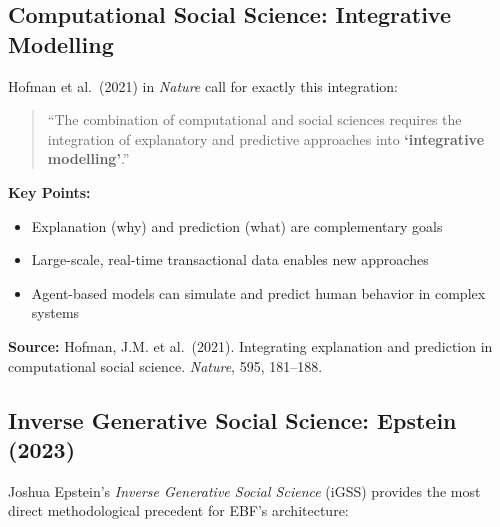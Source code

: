 \subsection{Computational Social Science: Integrative Modelling}

Hofman et al.\ (2021) in \textit{Nature} call for exactly this integration:

\begin{tcolorbox}[colback=blue!5!white, colframe=blue!75!black,
    title=\textbf{Hofman et al.\ (2021): Integrating Explanation and Prediction}]

\begin{quote}
``The combination of computational and social sciences requires the integration of
explanatory and predictive approaches into \textbf{`integrative modelling'}.''
\end{quote}

\textbf{Key Points:}
\begin{itemize}[nosep]
    \item Explanation (why) and prediction (what) are complementary goals
    \item Large-scale, real-time transactional data enables new approaches
    \item Agent-based models can simulate and predict human behavior in complex systems
\end{itemize}

\textbf{Source:} Hofman, J.M. et al.\ (2021). Integrating explanation and prediction in
computational social science. \textit{Nature}, 595, 181--188.

\end{tcolorbox}

\subsection{Inverse Generative Social Science: Epstein (2023)}

Joshua Epstein's \textit{Inverse Generative Social Science} (iGSS) provides the most direct
methodological precedent for EBF's architecture:

